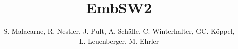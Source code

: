 \documentclass[titlepage=true]{scrartcl}
\title{EmbSW2}
\author{S. Malacarne, R. Nestler, J. Pult, A. Schälle, C.
Winterhalter, GC. Köppel, \\L. Leuenberger, M. Ehrler}
\begin{document}
\begin{titlepage}
   \thispagestyle{empty}
   \maketitle
\end{titlepage}

\lstset{style=Csharp}



\tableofcontents \newpage









\end{document}
